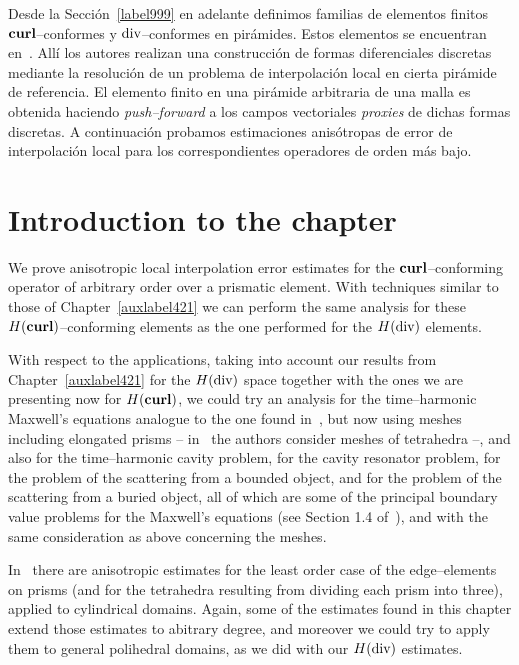 Desde la Secci\'on~\ref{label999} en adelante definimos
familias de elementos finitos 
$\textbf{curl}$--conformes y $\operatorname{\textrm{div}}$--conformes en pi\-r\'ami\-des. Estos elementos
se encuentran en~\cite{gh99,hiptmair}. All\'i los autores
realizan una construcci\'on de formas diferenciales discre\-tas
mediante la resoluci\'on de un problema de interpolaci\'on local
en cierta pi\-r\'ami\-de de referencia. El elemento finito en una
pi\-r\'ami\-de arbitraria de una malla es obtenida haciendo \emph{push--forward} a
los campos vectoriales \emph{proxies} de dichas formas discre\-tas.
A continuaci\'on probamos estimaciones anis\'otropas de error de interpolaci\'on
local para los correspondientes operadores de orden m\'as bajo.

\section*{Introduction to the chapter}

We prove anisotropic local interpolation error estimates for the
$\textbf{curl}$--con\-for\-ming operator of arbitrary order over a prismatic element.
With techniques similar to those of Chapter~\ref{auxlabel421} we can
perform the same analysis for these $H(\textbf{curl})$--con\-for\-ming elements
as the one performed for the $H(\operatorname{\textrm{div}})$ elements.

With respect to the applications,
taking into account our results 
from Chapter~\ref{auxlabel421}
for the $H(\operatorname{\textrm{div}})$ space together with the ones we are presenting now
for $H(\textbf{curl})$, we could try an analysis for the
time--harmonic Maxwell's equations analogue to the one found
in~\cite{buffaCostabelDauge}, but now using meshes including
elongated prisms -- in~\cite{buffaCostabelDauge} the authors consider
meshes of tetrahedra --, and also for the time--harmonic cavity problem,
for the cavity resonator problem, for the problem of the scattering from a 
bounded object, and for the problem of the scattering from a
buried object, all of which are some of the principal boundary value
problems for the Maxwell's equations (see Section 1.4 of~\cite{monk}),
and with the same consideration as above concerning the meshes.

In~\cite{MR1860445} there are anisotropic estimates for 
the least order case of the edge--elements on prisms
(and for the tetrahedra resulting from dividing each prism into three),
applied to cylindrical domains.
Again, some of the estimates found in this chapter extend those estimates
to abitrary degree, and moreover we could try to apply them
to general polihedral domains, as we did with our $H(\operatorname{\textrm{div}})$ estimates.

